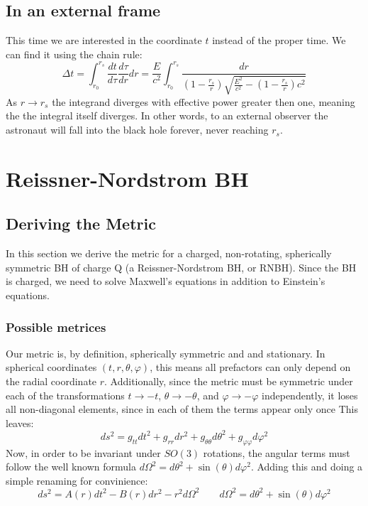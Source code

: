 \documentclass{article}
\begin{document}
\subsection{In an external frame}
This time we are interested in the coordinate $t$ instead of the proper time. We can find it using the chain rule:
\begin{equation}
    \Delta t = \int_{r_0}^{r_s}\frac{dt}{d\tau}\frac{d\tau}{dr}dr = 
    \frac{E}{c^2}\int_{r_0}^{r_s}
    \frac{dr}{\left(1 - \frac{r_s}{r}\right)\sqrt{\frac{E^2}{c^2} - \left(1 - \frac{r_s}{r}\right)c^2}}
\end{equation}
As $r \rightarrow r_s$ the integrand diverges with effective power greater then one, meaning the the integral itself diverges. In other words, to an external observer the astronaut will fall into the black hole forever, never reaching $r_s$.

\section{Reissner-Nordstrom BH}
\subsection{Deriving the Metric}
In this section we derive the metric for a charged, non-rotating, spherically symmetric BH of charge Q
(a Reissner-Nordstrom BH, or RNBH). Since the BH is charged, we need to solve Maxwell's equations in
addition to Einstein's equations.
\subsubsection{Possible metrices}
Our metric is, by definition, spherically symmetric and and stationary.  
In spherical coordinates $(t, r, \theta, \varphi)$, this means all prefactors can only depend on the radial coordinate $r$. Additionally, since the metric must be symmetric under each of the transformations $t \rightarrow -t$, $\theta \rightarrow -\theta$, and $\varphi \rightarrow -\varphi$ independently, it loses all non-diagonal elements, since in each of them the terms appear only once This leaves:
\begin{equation}
    ds^2 = g_{tt}dt^2 + g_{rr}dr^2 + g_{\theta\theta}d\theta^2 + g_{\varphi\varphi}d\varphi^2
\end{equation}
Now, in order to be invariant under $SO(3)$ rotations, the angular terms must follow the well known formula $d\Omega^2 = d\theta^2 + \sin(\theta)d\varphi^2$. Adding this and doing a simple renaming for convinience:
\begin{equation}
\label{eq:generic-spherical-metric}
    ds^2 = A(r)dt^2 - B(r)dr^2 - r^2 d\Omega^2
    \qquad
    d\Omega^2 = d\theta^2 + \sin(\theta)d\varphi^2
\end{equation}
\end{document}
